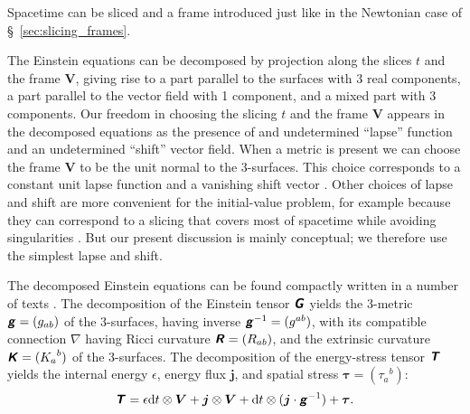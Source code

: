 \documentclass[\ifafour a4paper,12pt,\else a5paper,10pt,\fi%
onecolumn,oneside,article,%
british%
]{memoir}
\theoremstyle{remark}
\theoremstyle{innote}
\newcommand*{\mathte}[1]{\textbf{\textit{\textsf{#1}}}}
\newcommand*{\citep}{\parencites}
\renewcommand*{\cites}{\parencites}
\newcommand*{\di}{\mathrm{d}}%
\renewcommand*{\|}{\nonscript\,\vert\nonscript\;\mathopen{}}
\newcommand*{\sect}{\S}%
\newcommand*{\chap}{ch.}%
\newcommand*{\yGG}{G}
\newcommand*{\yG}{\mathte{\yGG}}
\newcommand*{\yTT}{\tau}
\newcommand*{\yT}{\bm{\yTT}}
\newcommand*{\yTTf}{T}
\newcommand*{\yTf}{\mathte{\yTTf}}
\newcommand*{\ynn}{V}
\newcommand*{\yn}{\bm{\ynn}}
\newcommand*{\ygg}{g}
\newcommand*{\yg}{\mathte{\ygg}}
\newcommand*{\yKK}{K}
\newcommand*{\yK}{\mathte{\yKK}}
\newcommand*{\yRR}{R}
\newcommand*{\yR}{\mathte{\yRR}}
\newcommand*{\ypp}{j}
\newcommand*{\yp}{\bm{\ypp}}
\newcommand*{\ye}{\epsilon}
\newcommand*{\ynab}{\nabla}
\begin{document}
Spacetime can be sliced and a frame introduced just like in the Newtonian
case of \sect~\ref{sec:slicing_frames}.

The Einstein equations can be decomposed by projection along the slices $t$
and the frame $\yn$, giving rise to a part parallel to the surfaces with
3\;\texttimes{} real components, a part parallel to the vector field with
1 component, and a mixed part with 3 components. Our freedom in choosing
the slicing $t$ and the frame $\yn$ appears in the decomposed equations
as the presence of and undetermined \enquote{lapse} function and an
undetermined \enquote{shift} vector field. When a metric is present we can
choose the frame $\yn$ to be the unit normal to the 3-surfaces. This choice
corresponds to a constant unit lapse function and a vanishing shift vector
\citep{smarretal1978,smarretal1980}. Other choices of lapse and shift are
more convenient for the initial-value problem, for example because they can
correspond to a slicing that covers most of spacetime while avoiding
singularities \citep{smarretal1978}. But our present discussion is mainly
conceptual; we therefore use the simplest lapse and shift.

The decomposed Einstein equations can be found compactly written in a
number of texts
\cites[\sect~1.3]{wilsonetal2003_r2007}[\sect~4.3.2]{gourgoulhon2007}[\chap~2]{alcubierre2008}[\sect~7.2.2]{rezzollaetal2013}.
The decomposition of the Einstein tensor $\yG$ yields the 3-metric
$\yg=(\ygg_{ab})$ of the 3-surfaces, having inverse $\yg^{-1}=(\ygg^{ab})$,
with its compatible connection $\ynab$ having Ricci curvature
$\yR=(\yRR_{ab})$, and the extrinsic curvature $\yK=({\yKK_a}^b)$ of the
3-surfaces. The decomposition of the energy-stress tensor $\yTf$ yields the
internal energy $\ye$, energy flux $\yp$, and spatial stress
$\yT=({\yTT_a}^b)$:
\begin{equation}
  \label{eq:decomp_4stress}
  \yTf = \ye \di t \otimes\yn + \yp\otimes\yn + \di t
  \otimes(\yp\cdot\yg^{-1}) + \yT.
\end{equation}
\end{document}
